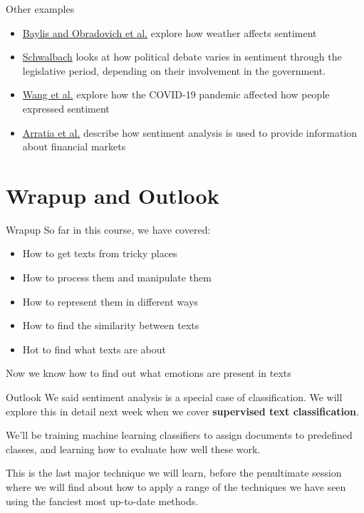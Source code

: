 \documentclass[
  10pt,
  ignorenonframetext,
  aspectratio=169]{beamer}
\providecommand{\tightlist}{%
  \setlength{\itemsep}{0pt}\setlength{\parskip}{0pt}}
\begin{document}
\begin{frame}{Other examples}
\protect\hypertarget{other-examples}{}
\begin{itemize}
\tightlist
\item
  \href{https://journals.plos.org/plosone/article?id=10.1371/journal.pone.0195750}{Baylis
  and Obradovich et al.} explore how weather affects sentiment
\item
  \href{https://www.cambridge.org/core/journals/european-political-science-review/article/abs/going-in-circles-the-influence-of-the-electoral-cycle-on-the-party-behaviour-in-parliament/B4693B1A27049DB3BCE314F32D6BD1EB}{Schwalbach}
  looks at how political debate varies in sentiment through the
  legislative period, depending on their involvement in the government.
\item
  \href{https://www.nature.com/articles/s41562-022-01312-y}{Wang et al.}
  explore how the COVID-19 pandemic affected how people expressed
  sentiment
\item
  \href{https://link.springer.com/chapter/10.1007/978-3-030-66891-4_9}{Arratia
  et al.} describe how sentiment analysis is used to provide information
  about financial markets
\end{itemize}
\end{frame}

\hypertarget{wrapup-and-outlook}{%
\section{Wrapup and Outlook}\label{wrapup-and-outlook}}

\begin{frame}{Wrapup}
\protect\hypertarget{wrapup}{}
So far in this course, we have covered:

\begin{itemize}
\tightlist
\item
  How to get texts from tricky places
\item
  How to process them and manipulate them
\item
  How to represent them in different ways
\item
  How to find the similarity between texts
\item
  Hot to find what texts are about
\end{itemize}

Now we know how to find out what emotions are present in texts
\end{frame}

\begin{frame}{Outlook}
\protect\hypertarget{outlook}{}
We said sentiment analysis is a special case of classification. We will
explore this in detail next week when we cover \textbf{supervised text
classification}.

We'll be training machine learning classifiers to assign documents to
predefined classes, and learning how to evaluate how well these work.

This is the last major technique we will learn, before the penultimate
session where we will find about how to apply a range of the techniques
we have seen using the fanciest most up-to-date methods.
\end{frame}
\end{document}
